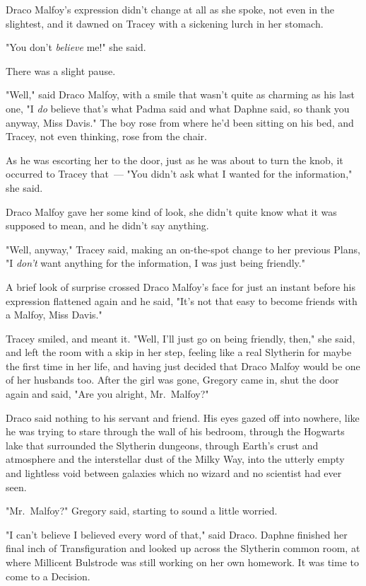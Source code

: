 Draco Malfoy's expression didn't change at all as she spoke, not even in the
slightest, and it dawned on Tracey with a sickening lurch in her stomach.

"You don't \emph{believe} me!" she said.

There was a slight pause.

"Well," said Draco Malfoy, with a smile that wasn't quite as charming as his
last one, "I \emph{do} believe that's what Padma said and what Daphne said, so
thank you anyway, Miss Davis." The boy rose from where he'd been sitting on his
bed, and Tracey, not even thinking, rose from the chair.

As he was escorting her to the door, just as he was about to turn the knob, it
occurred to Tracey that~--- "You didn't ask what I wanted for the information,"
she said.

Draco Malfoy gave her some kind of look, she didn't quite know what it was
supposed to mean, and he didn't say anything.

"Well, anyway," Tracey said, making an on-the-spot change to her previous
Plans, "I \emph{don't} want anything for the information, I was just being
friendly."

A brief look of surprise crossed Draco Malfoy's face for just an instant before
his expression flattened again and he said, "It's not that easy to become
friends with a Malfoy, Miss Davis."

Tracey smiled, and meant it. "Well, I'll just go on being friendly, then," she
said, and left the room with a skip in her step, feeling like a real Slytherin
for maybe the first time in her life, and having just decided that Draco Malfoy
would be one of her husbands too.
\sbreak
After the girl was gone, Gregory came in, shut the door again and said, "Are
you alright, Mr.~Malfoy?"

Draco said nothing to his servant and friend. His eyes gazed off into nowhere,
like he was trying to stare through the wall of his bedroom, through the
Hogwarts lake that surrounded the Slytherin dungeons, through Earth's crust and
atmosphere and the interstellar dust of the Milky Way, into the utterly empty
and lightless void between galaxies which no wizard and no scientist had ever
seen.

"Mr.~Malfoy?" Gregory said, starting to sound a little worried.

"I can't believe I believed every word of that," said Draco.
\sbreak
Daphne finished her final inch of Transfiguration and looked up across the
Slytherin common room, at where Millicent Bulstrode was still working on her
own homework. It was time to come to a Decision.

